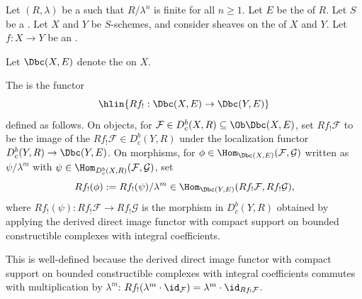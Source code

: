 \begin{definition} \label{definition:derived_direct_image_functor_with_compact_support_on_bounded_constructible_complexes_with_rational_coefficients_on_a_noetherian_scheme}
Let $(R, \lambda)$ be a   such that $R/\lambda^n$ is finite for all $n \geq 1$. Let $E$ be the  of $R$. Let $S$ be a . Let $X$ and $Y$ be  $S$-schemes, and consider sheaves on the  of $X$ and $Y$. Let $f: X \to Y$ be an .

Let $\Dbc(X, E)$ denote the  on $X$.

The  is the functor
$$\hlin{Rf_! : \Dbc(X, E) \to \Dbc(Y, E)}$$
defined as follows. On objects, for $\mathcal{F} \in D_c^b(X, R) \subseteq \Ob \Dbc(X, E)$, set $Rf_! \mathcal{F}$ to be the image of the  $Rf_! \mathcal{F} \in D_c^b(Y, R)$ under the localization functor $D_c^b(Y, R) \to \Dbc(Y, E)$. On morphisms, for $\phi \in \Hom_{\Dbc(X, E)}(\mathcal{F}, \mathcal{G})$ written as $\psi / \lambda^m$ with $\psi \in \Hom_{D_c^b(X, R)}(\mathcal{F}, \mathcal{G})$, set
$$Rf_! (\phi) := Rf_!(\psi) / \lambda^m \in \Hom_{\Dbc(Y, E)}(Rf_! \mathcal{F}, Rf_! \mathcal{G}),$$
where $Rf_!(\psi): Rf_! \mathcal{F} \to Rf_! \mathcal{G}$ is the morphism in $D_c^b(Y, R)$ obtained by applying the derived direct image functor with compact support on bounded constructible complexes with integral coefficients.

This is well-defined because the derived direct image functor with compact support on bounded constructible complexes with integral coefficients commutes with multiplication by $\lambda^m$: $Rf_!(\lambda^m \cdot \id_\mathcal{F}) = \lambda^m \cdot \id_{Rf_! \mathcal{F}}$.
\end{definition}
